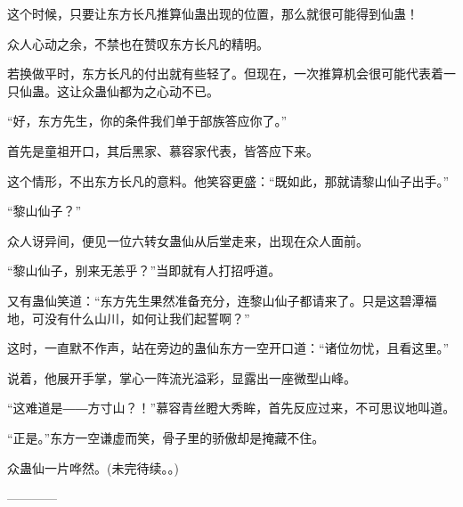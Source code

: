 \begin{this_body}
这个时候，只要让东方长凡推算仙蛊出现的位置，那么就很可能得到仙蛊！

众人心动之余，不禁也在赞叹东方长凡的精明。

若换做平时，东方长凡的付出就有些轻了。但现在，一次推算机会很可能代表着一只仙蛊。这让众蛊仙都为之心动不已。

“好，东方先生，你的条件我们单于部族答应你了。”

首先是童祖开口，其后黑家、慕容家代表，皆答应下来。

这个情形，不出东方长凡的意料。他笑容更盛：“既如此，那就请黎山仙子出手。”

“黎山仙子？”

众人讶异间，便见一位六转女蛊仙从后堂走来，出现在众人面前。

“黎山仙子，别来无恙乎？”当即就有人打招呼道。

又有蛊仙笑道：“东方先生果然准备充分，连黎山仙子都请来了。只是这碧潭福地，可没有什么山川，如何让我们起誓啊？”

这时，一直默不作声，站在旁边的蛊仙东方一空开口道：“诸位勿忧，且看这里。”

说着，他展开手掌，掌心一阵流光溢彩，显露出一座微型山峰。

“这难道是――方寸山？！”慕容青丝瞪大秀眸，首先反应过来，不可思议地叫道。

“正是。”东方一空谦虚而笑，骨子里的骄傲却是掩藏不住。

众蛊仙一片哗然。(未完待续。。)

------------

\end{this_body}


